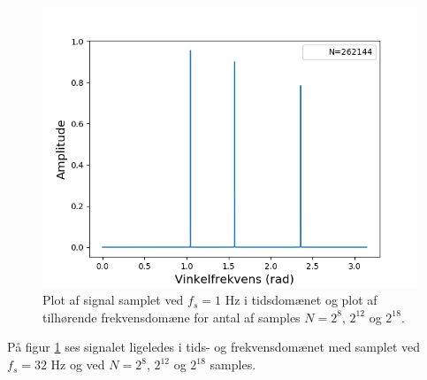 \begin{figure}[H]
\begin{minipage}{0.49\textwidth}
\includegraphics[width=\textwidth]{figures/frekvensanalyse/1hz_freq3.png}
\end{minipage}
\caption{Plot af signal samplet ved $f_s=1$ Hz i tidsdomænet og plot af tilhørende frekvensdomæne for antal af samples $N=2^8$, $2^{12}$ og $2^{18}$.}
\label{fig:1}
\end{figure}
\noindent På figur \ref{fig:1} ses signalet ligeledes i tids- og frekvensdomænet med samplet ved $f_s=32$ Hz og ved $N=2^8$, $2^{12}$ og $2^{18}$ samples.
